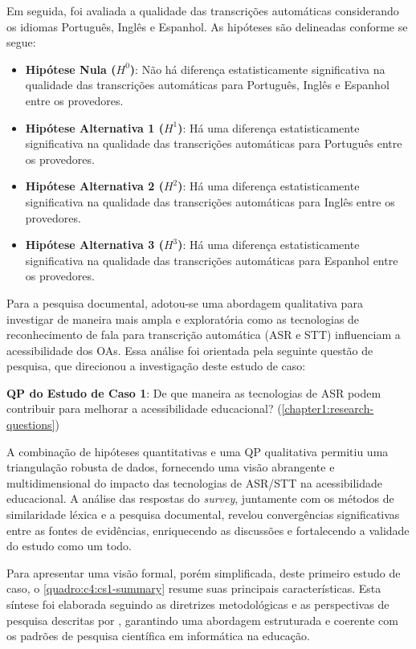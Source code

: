 Em seguida, foi avaliada a qualidade das transcrições automáticas considerando os idiomas Português, Inglês e Espanhol. As hipóteses são delineadas conforme se segue:

\begin{itemize}
\item \textbf{Hipótese Nula ($H^0$)}: Não há diferença estatisticamente significativa na qualidade das transcrições automáticas para Português, Inglês e Espanhol entre os provedores.
\item \textbf{Hipótese Alternativa 1 ($H^1$)}: Há uma diferença estatisticamente significativa na qualidade das transcrições automáticas para Português entre os provedores.
\item \textbf{Hipótese Alternativa 2 ($H^2$)}: Há uma diferença estatisticamente significativa na qualidade das transcrições automáticas para Inglês entre os provedores.
\item \textbf{Hipótese Alternativa 3 ($H^3$)}: Há uma diferença estatisticamente significativa na qualidade das transcrições automáticas para Espanhol entre os provedores.
\end{itemize}

Para a pesquisa documental, adotou-se uma abordagem qualitativa para investigar de maneira mais ampla e exploratória como as tecnologias de reconhecimento de fala para transcrição automática (ASR e STT) influenciam a acessibilidade dos OAs. Essa análise foi orientada pela seguinte questão de pesquisa, que direcionou a investigação deste estudo de caso:

\begin{citacao}
\textbf{QP do Estudo de Caso 1}: De que maneira as tecnologias de ASR podem contribuir para melhorar a acessibilidade educacional? (\autoref{chapter1:research-questions})
\end{citacao}

A combinação de hipóteses quantitativas e uma QP qualitativa permitiu uma triangulação robusta de dados, fornecendo uma visão abrangente e multidimensional do impacto das tecnologias de ASR/STT na acessibilidade educacional. A análise das respostas do \textit{survey}, juntamente com os métodos de similaridade léxica e a pesquisa documental, revelou convergências significativas entre as fontes de evidências, enriquecendo as discussões e fortalecendo a validade do estudo como um todo.

Para apresentar uma visão formal, porém simplificada, deste primeiro estudo de caso, o \autoref{quadro:c4:cs1-summary} resume suas principais características. Esta síntese foi elaborada seguindo as diretrizes metodológicas e as perspectivas de pesquisa descritas por , garantindo uma abordagem estruturada e coerente com os padrões de pesquisa científica em informática na educação.

